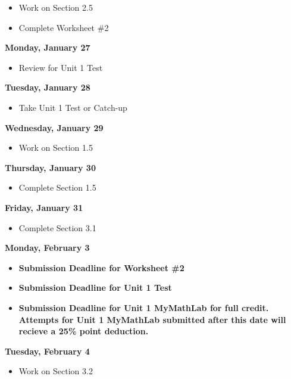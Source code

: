 \documentclass[11pt]{article}
\begin{document}
\begin{itemize}
\item Work on Section 2.5
\item Complete Worksheet \#2
\end{itemize}

\textbf{Monday, January 27}

\begin{itemize}
\item Review for Unit 1 Test
\end{itemize}

\textbf{Tuesday, January 28}

\begin{itemize}
\item Take Unit 1 Test or Catch-up
\end{itemize}

\textbf{Wednesday, January 29}

\begin{itemize}
\item Work on Section 1.5
\end{itemize}

\textbf{Thursday, January 30}

\begin{itemize}
\item Complete Section 1.5
\end{itemize}

\textbf{Friday, January 31}

\begin{itemize}
\item Complete Section 3.1
\end{itemize}

\textbf{Monday, February 3}

\begin{itemize}
\item \textbf{Submission Deadline for Worksheet \#2}
\item \textbf{Submission Deadline for Unit 1 Test}
\item \textbf{Submission Deadline for Unit 1 MyMathLab for full credit. Attempts for Unit 1 MyMathLab submitted after this date will recieve a 25\% point deduction.}
\end{itemize}

\textbf{Tuesday, February 4}

\begin{itemize}
\item Work on Section 3.2
\end{itemize}
\end{document}
